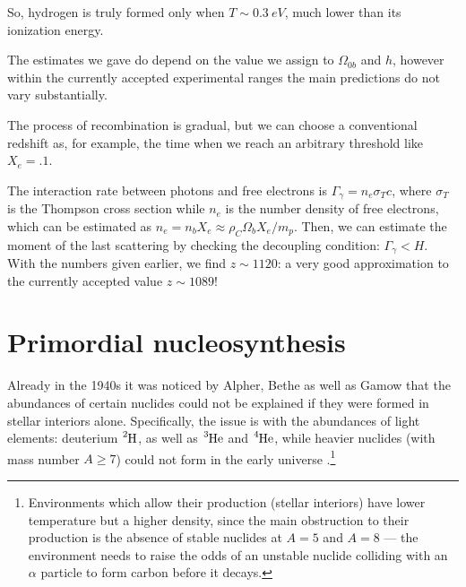 \documentclass[main.tex]{subfiles}
\begin{document}
So, hydrogen is truly formed only when \(T \sim \SI{0.3}{eV}\), much lower than its ionization energy.


The estimates we gave do depend on the value we assign to \(\Omega_{0b}\) and \(h\), however within the currently accepted experimental ranges the main predictions do not vary substantially. 

The process of recombination is gradual, but we can choose a conventional redshift as, for example, the time when we reach an arbitrary threshold like \(X_e = \num{.1}\). 

The interaction rate between photons and free electrons is \(\Gamma_{\gamma } = n_e \sigma_T c\), where \(\sigma _T\) is the Thompson cross section while \(n_e\) is the number density of free electrons, which can be estimated as \(n_e = n_b X_e \approx \rho_C \Omega_{b} X_e / m_p\). 
Then, we can estimate the moment of the last scattering by checking the decoupling condition: \(\Gamma _\gamma < H\). 
With the numbers given earlier, we find \(z \sim 1120\): a very good approximation to the currently accepted value \(z \sim 1089\)!




\section{Primordial nucleosynthesis}

Already in the 1940s it was noticed by Alpher, Bethe as well as Gamow that the abundances of certain nuclides could not be explained if they were formed in stellar interiors alone. 
Specifically, the issue is with the abundances of light elements: deuterium \(\ce{^{2}H}\), as well as \(\ce{^{3}He}\) and \(\ce{^{4}He}\), while heavier nuclides (with mass number \(A \geq 7\)) could not form in the early universe \cite[sec.\ 8.6.1]{LucchinColes:2002}.\footnote{Environments which allow their production (stellar interiors) have lower temperature but a higher density, since the main obstruction to their production is the absence of stable nuclides at \(A = 5\) and \(A= 8\) --- the environment needs to raise the odds of an unstable  nuclide colliding with an \(\alpha \) particle to form carbon before it decays.}
\end{document}
